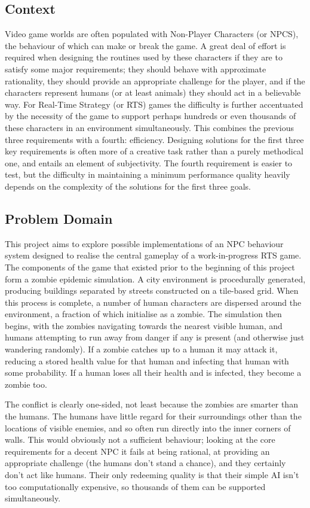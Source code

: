 \documentclass[12pt,a4paper]{article}
\begin{document}
\subsection{Context}\noindent
Video game worlds are often populated with Non-Player Characters (or NPCS), the behaviour of which can make or break the game. A great deal of effort is required when designing the routines used by these characters if they are to satisfy some major requirements; they should behave with approximate rationality, they should provide an appropriate challenge for the player, and if the characters represent humans (or at least animals) they should act in a believable way. For Real-Time Strategy (or RTS) games the difficulty is further accentuated by the necessity of the game to support perhaps hundreds or even thousands of these characters in an environment simultaneously. This combines the previous three requirements with a fourth: efficiency. Designing solutions for the first three key requirements is often more of a creative task rather than a purely methodical one, and entails an element of subjectivity. The fourth requirement is easier to test, but the difficulty in maintaining a minimum performance quality heavily depends on the complexity of the solutions for the first three goals.

\subsection{Problem Domain}\noindent
This project aims to explore possible implementations of an NPC behaviour system designed to realise the central gameplay of a work-in-progress RTS game. The components of the game that existed prior to the beginning of this project form a zombie epidemic simulation. A city environment is procedurally generated, producing buildings separated by streets constructed on a tile-based grid. When this process is complete, a number of human characters are dispersed around the environment, a fraction of which initialise as a zombie. The simulation then begins, with the zombies navigating towards the nearest visible human, and humans attempting to run away from danger if any is present (and otherwise just wandering randomly). If a zombie catches up to a human it may attack it, reducing a stored health value for that human and infecting that human with some probability. If a human loses all their health and is infected, they become a zombie too.

The conflict is clearly one-sided, not least because the zombies are smarter than the humans. The humans have little regard for their surroundings other than the locations of visible enemies, and so often run directly into the inner corners of walls. This would obviously not a sufficient behaviour; looking at the core requirements for a decent NPC it fails at being rational, at providing an appropriate challenge (the humans don't stand a chance), and they certainly don't act like humans. Their only redeeming quality is that their simple AI isn't too computationally expensive, so thousands of them can be supported simultaneously.
\end{document}
